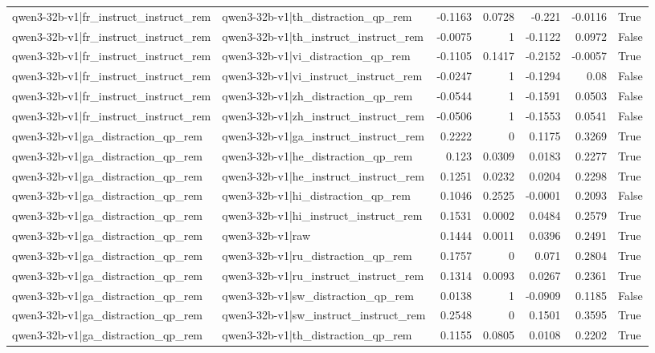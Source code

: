 \begin{table}
\begin{tabular}{l l r r r r l}
qwen3-32b-v1|fr_instruct_instruct_rem & qwen3-32b-v1|th_distraction_qp_rem & -0.1163 & 0.0728 & -0.221 & -0.0116 & True \\
qwen3-32b-v1|fr_instruct_instruct_rem & qwen3-32b-v1|th_instruct_instruct_rem & -0.0075 & 1 & -0.1122 & 0.0972 & False \\
qwen3-32b-v1|fr_instruct_instruct_rem & qwen3-32b-v1|vi_distraction_qp_rem & -0.1105 & 0.1417 & -0.2152 & -0.0057 & True \\
qwen3-32b-v1|fr_instruct_instruct_rem & qwen3-32b-v1|vi_instruct_instruct_rem & -0.0247 & 1 & -0.1294 & 0.08 & False \\
qwen3-32b-v1|fr_instruct_instruct_rem & qwen3-32b-v1|zh_distraction_qp_rem & -0.0544 & 1 & -0.1591 & 0.0503 & False \\
qwen3-32b-v1|fr_instruct_instruct_rem & qwen3-32b-v1|zh_instruct_instruct_rem & -0.0506 & 1 & -0.1553 & 0.0541 & False \\
qwen3-32b-v1|ga_distraction_qp_rem & qwen3-32b-v1|ga_instruct_instruct_rem & 0.2222 & 0 & 0.1175 & 0.3269 & True \\
qwen3-32b-v1|ga_distraction_qp_rem & qwen3-32b-v1|he_distraction_qp_rem & 0.123 & 0.0309 & 0.0183 & 0.2277 & True \\
qwen3-32b-v1|ga_distraction_qp_rem & qwen3-32b-v1|he_instruct_instruct_rem & 0.1251 & 0.0232 & 0.0204 & 0.2298 & True \\
qwen3-32b-v1|ga_distraction_qp_rem & qwen3-32b-v1|hi_distraction_qp_rem & 0.1046 & 0.2525 & -0.0001 & 0.2093 & False \\
qwen3-32b-v1|ga_distraction_qp_rem & qwen3-32b-v1|hi_instruct_instruct_rem & 0.1531 & 0.0002 & 0.0484 & 0.2579 & True \\
qwen3-32b-v1|ga_distraction_qp_rem & qwen3-32b-v1|raw & 0.1444 & 0.0011 & 0.0396 & 0.2491 & True \\
qwen3-32b-v1|ga_distraction_qp_rem & qwen3-32b-v1|ru_distraction_qp_rem & 0.1757 & 0 & 0.071 & 0.2804 & True \\
qwen3-32b-v1|ga_distraction_qp_rem & qwen3-32b-v1|ru_instruct_instruct_rem & 0.1314 & 0.0093 & 0.0267 & 0.2361 & True \\
qwen3-32b-v1|ga_distraction_qp_rem & qwen3-32b-v1|sw_distraction_qp_rem & 0.0138 & 1 & -0.0909 & 0.1185 & False \\
qwen3-32b-v1|ga_distraction_qp_rem & qwen3-32b-v1|sw_instruct_instruct_rem & 0.2548 & 0 & 0.1501 & 0.3595 & True \\
qwen3-32b-v1|ga_distraction_qp_rem & qwen3-32b-v1|th_distraction_qp_rem & 0.1155 & 0.0805 & 0.0108 & 0.2202 & True \\

\end{tabular}
\end{table}

